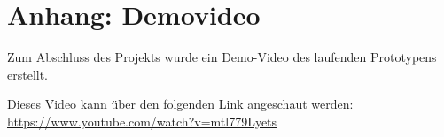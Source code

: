 \chapter{Anhang: Demovideo} \label{appendix-demo}

Zum Abschluss des Projekts wurde ein Demo-Video des laufenden Prototypens erstellt.

Dieses Video kann über den folgenden Link angeschaut werden: \url{https://www.youtube.com/watch?v=mtl779Lyets}